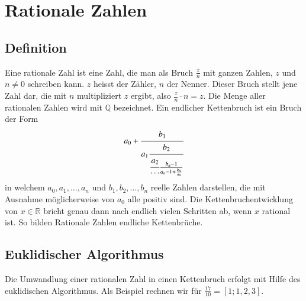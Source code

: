   
%
%
%
\section{Rationale Zahlen
\label{kettenbruch:section:Zahlen}}
\subsection{Definition}
Eine rationale Zahl ist eine Zahl, die man als Bruch $\frac{z}{n}$ mit ganzen
Zahlen, $z$ und $n \ne 0$ schreiben kann. $z$ heisst der Zähler,
$n$ der Nenner. Dieser Bruch stellt jene Zahl dar, die mit $n$
multipliziert $z$ ergibt, also $\frac{z}{n} \cdot n = z$.
Die Menge aller rationalen Zahlen wird mit $\mathbb{Q}$ bezeichnet.
Ein endlicher Kettenbruch ist ein Bruch der Form
\begin{equation}
a_0 + \cfrac{b_1}{a_1\cfrac{b_2}{\cfrac{a_2}{\cdots}\frac{b_n-1}{a_n-1 + \frac{b_n}{a_n}}}}
\end{equation}
in welchem $a_0, a_1,\dots,a_n$ und $b_1,b_2,\dots,b_n$ reelle Zahlen
darstellen, die mit Ausnahme möglicherweise von $a_0$ alle positiv sind.
Die Kettenbruchentwicklung von $x \in \mathbb{R}$ bricht genau dann
nach endlich vielen Schritten ab, wenn $x$ rational ist. So bilden
Rationale Zahlen endliche Kettenbrüche.

\subsection{Euklidischer Algorithmus}
Die Umwandlung einer rationalen Zahl in einen Kettenbruch erfolgt
mit Hilfe des euklidischen Algorithmus.
Als Beispiel rechnen wir für $\frac{17}{10} = [1;1,2,3]$.


